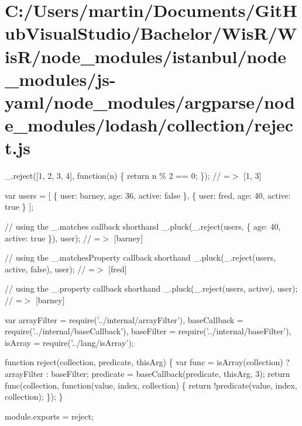\hypertarget{_c_1_2_users_2martin_2_documents_2_git_hub_visual_studio_2_bachelor_2_wis_r_2_wis_r_2node_module44c42a36dd3854cd8504d6c819b57b4b}{}\section{C\+:/\+Users/martin/\+Documents/\+Git\+Hub\+Visual\+Studio/\+Bachelor/\+Wis\+R/\+Wis\+R/node\+\_\+modules/istanbul/node\+\_\+modules/js-\/yaml/node\+\_\+modules/argparse/node\+\_\+modules/lodash/collection/reject.\+js}
\+\_\+.\+reject(\mbox{[}1, 2, 3, 4\mbox{]}, function(n) \{ return n \% 2 == 0; \}); // =$>$ \mbox{[}1, 3\mbox{]}

var users = \mbox{[} \{ \textquotesingle{}user\textquotesingle{}\+: \textquotesingle{}barney\textquotesingle{}, \textquotesingle{}age\textquotesingle{}\+: 36, \textquotesingle{}active\textquotesingle{}\+: false \}, \{ \textquotesingle{}user\textquotesingle{}\+: \textquotesingle{}fred\textquotesingle{}, \textquotesingle{}age\textquotesingle{}\+: 40, \textquotesingle{}active\textquotesingle{}\+: true \} \mbox{]};

// using the {\ttfamily \+\_\+.\+matches} callback shorthand \+\_\+.\+pluck(\+\_\+.\+reject(users, \{ \textquotesingle{}age\textquotesingle{}\+: 40, \textquotesingle{}active\textquotesingle{}\+: true \}), \textquotesingle{}user\textquotesingle{}); // =$>$ \mbox{[}\textquotesingle{}barney\textquotesingle{}\mbox{]}

// using the {\ttfamily \+\_\+.\+matches\+Property} callback shorthand \+\_\+.\+pluck(\+\_\+.\+reject(users, \textquotesingle{}active\textquotesingle{}, false), \textquotesingle{}user\textquotesingle{}); // =$>$ \mbox{[}\textquotesingle{}fred\textquotesingle{}\mbox{]}

// using the {\ttfamily \+\_\+.\+property} callback shorthand \+\_\+.\+pluck(\+\_\+.\+reject(users, \textquotesingle{}active\textquotesingle{}), \textquotesingle{}user\textquotesingle{}); // =$>$ \mbox{[}\textquotesingle{}barney\textquotesingle{}\mbox{]}


\begin{DoxyCodeInclude}
var arrayFilter = require(\textcolor{stringliteral}{'../internal/arrayFilter'}),
    baseCallback = require(\textcolor{stringliteral}{'../internal/baseCallback'}),
    baseFilter = require(\textcolor{stringliteral}{'../internal/baseFilter'}),
    isArray = require(\textcolor{stringliteral}{'../lang/isArray'});

\textcolor{keyword}{function} reject(collection, predicate, thisArg) \{
  var func = isArray(collection) ? arrayFilter : baseFilter;
  predicate = baseCallback(predicate, thisArg, 3);
  \textcolor{keywordflow}{return} func(collection, \textcolor{keyword}{function}(value, index, collection) \{
    \textcolor{keywordflow}{return} !predicate(value, index, collection);
  \});
\}

module.exports = reject;
\end{DoxyCodeInclude}
 